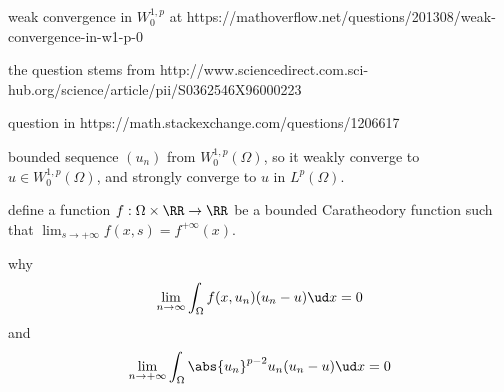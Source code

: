 weak convergence in $W_{0}^{1,p}$ at https://mathoverflow.net/questions/201308/weak-convergence-in-w1-p-0

the question stems from http://www.sciencedirect.com.sci-hub.org/science/article/pii/S0362546X96000223

question in https://math.stackexchange.com/questions/1206617

bounded sequence $(u_n)$ from $W_0^{1,p}(\Omega)$, 
so it weakly converge to $u\in W_0^{1,p}(\Omega)$,
and strongly converge to $u$ in $L^p(\Omega)$. 

define a function $f:\Omega\times\RR\to\RR$ be a 
bounded Caratheodory function such that $\lim_{s\to+\infty}f(x,s)=f^{+\infty}(x)$.

why
\begin{equation}
				\lim_{n\to\infty}\int_{\Omega}f(x,u_n)(u_n-u)\ud x=0
				\label{eq:1}
\end{equation}
and
\begin{equation}
				\lim_{n\to+\infty}\int_{\Omega}\abs{u_n}^{p-2}u_n(u_n-u)\ud x=0
				\label{eq:2}
\end{equation}


